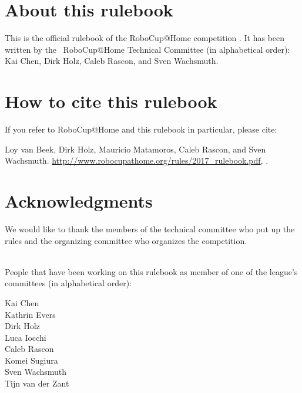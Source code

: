 


\section*{About this rulebook}
This is the official rulebook of the RoboCup@Home competition \YEAR.
It has been written by the \YEAR ~RoboCup@Home Technical Committee (in alphabetical order): 
Kai Chen,
Dirk Holz,
Caleb Rascon, and
Sven Wachsmuth.

\section*{How to cite this rulebook}
If you refer to RoboCup@Home and this rulebook in particular, please cite:

Loy van Beek, Dirk Holz, Mauricio Matamoros, Caleb Rascon, and Sven Wachsmuth. 
\url{http://www.robocupathome.org/rules/2017_rulebook.pdf}, \YEAR.



\section*{Acknowledgments}
\label{sec:acknowledgments}
We would like to thank the members of the technical committee who put up the rules and the organizing committee who organizes the competition.  

~\\\noindent People that have been working on this rulebook as member of one of the league's committees (in alphabetical order):
\begin{multicols}{3}%
\noindent%
Kai Chen\\
Kathrin Evers\\
\columnbreak
Dirk Holz\\
Luca Iocchi\\
Caleb Rascon\\
\columnbreak
Komei Sugiura\\
Sven Wachsmuth\\
Tijn van der Zant\\
\end{multicols}

